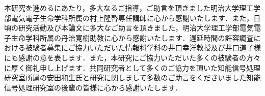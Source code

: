 \begin{acknowledgement}
本研究を進めるにあたり，多大なるご指導，ご助言を頂きました明治大学理工学部電気電子生命学科所属の村上隆啓専任講師に心から感謝いたします．また，日頃の研究活動及び本論文に多大なご助言を頂きました，明治大学理工学部電気電子生命学科所属の丹治寛樹助教に心から感謝いたします．遅延時間の許容調査における被験者募集にご協力いただいた情報科学科の井口幸洋教授及び井口道子様にも感謝の意を表します．また，本研究にご協力いただいた多くの被験者の方々に厚く御礼申し上げます．共同研究者として多くのご協力を頂いた知能信号処理研究室所属の安田和生氏と研究に関しまして多数のご助言をくださいました知能信号処理研究室の後輩の皆様に心から感謝いたします．
\makesignature
\end{acknowledgement}

